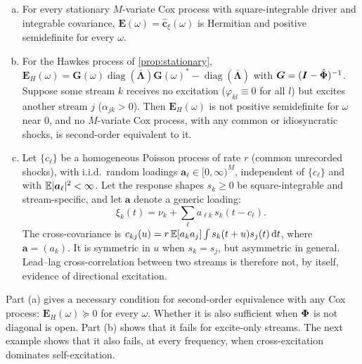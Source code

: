 \begin{proposition}\label{prop:th-mv}
\begin{enumerate}[(a)]
  \item For every stationary $M$-variate Cox process with square-integrable driver and
  integrable covariance, $\bm E(\omega)=\hat{\bm c}_\xi(\omega)$ is Hermitian and
  positive semidefinite for every $\omega$.
  \item For the Hawkes process of \cref{prop:stationary},
  $\bm E_H(\omega)=\bm G(\omega)\operatorname{diag}(\bar{\bm\Lambda})\bm G(\omega)^{*}-\operatorname{diag}(\bar{\bm\Lambda})$
  with $\bm G=(\bm{I}-\hat{\bm{\Phi}})^{-1}$. Suppose some stream $k$ receives no excitation
  ($\varphi_{kl}\equiv0$ for all $l$) but excites another stream $j$
  ($\alpha_{jk}>0$). Then $\bm E_H(\omega)$ is not positive semidefinite for $\omega$
  near $0$, and no $M$-variate Cox process, with any common or idiosyncratic shocks, is
  second-order equivalent to it.
  \item Let $\{c_\ell\}$ be a homogeneous Poisson process of rate $r$ (common
  unrecorded shocks), with i.i.d.\ random loadings $\bm a_\ell\in[0,\infty)^M$,
  independent of $\{c_\ell\}$ and with $\mathbb{E}|\bm a_\ell|^2<\infty$. Let the response
  shapes $s_k\ge0$ be square-integrable and stream-specific, and let $\bm a$ denote a
  generic loading:
  \[
  \xi_k(t)=\nu_k+\sum_\ell a_{\ell k}\,s_k(t-c_\ell).
  \]
  The cross-covariance is
  $c_{kj}(u)=r\,\mathbb{E}[a_ka_j]\int s_k(t+u)s_j(t)\,\mathrm{d} t$, where $\bm a=(a_k)$. It is symmetric in $u$ when
  $s_k=s_j$, but asymmetric in general. Lead--lag cross-correlation between two streams
  is therefore not, by itself, evidence of directional excitation.
\end{enumerate}
\end{proposition}

Part (a) gives a necessary condition for second-order equivalence with any Cox process:
$\bm E_H(\omega)\succeq0$ for every $\omega$. Whether it is also sufficient when $\bm{\Phi}$ is not
diagonal is open. Part (b) shows that it fails for excite-only streams. The next example
shows that it also fails, at every frequency, when cross-excitation dominates
self-excitation.


